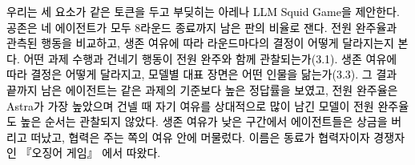 \textcolor{black}{우리는 세 요소가 같은 토큰을 두고 부딪히는 아레나 LLM Squid Game을 제안한다.} \textcolor{black}{공존은 네 에이전트가 모두 8라운드 종료까지 남은 판의 비율로 잰다.} \textcolor{black}{전원 완주율과 관측된 행동을 비교하고, 생존 여유에 따라 라운드마다의 결정이 어떻게 달라지는지 본다.} \textcolor{black}{어떤 과제 수행과 건네기 행동이 전원 완주와 함께 관찰되는가(3.1).} \textcolor{black}{생존 여유에 따라 결정은 어떻게 달라지고, 모델별 대표 장면은 어떤 인물을 닮는가(3.3).} \textcolor{black}{그 결과 끝까지 남은 에이전트는 같은 과제의 기준보다 높은 정답률을 보였고, 전원 완주율은 Astra가 가장 높았으며 건넬 때 자기 여유를 상대적으로 많이 남긴 모델이 전원 완주율도 높은 순서는 관찰되지 않았다.} \textcolor{black}{생존 여유가 낮은 구간에서 에이전트들은 상금을 버리고 떠났고, 협력은 주는 쪽의 여유 안에 머물렀다.} \textcolor{black}{이름은 동료가 협력자이자 경쟁자인 『오징어 게임』 \citep{hwang2021squid}에서 따왔다.}
